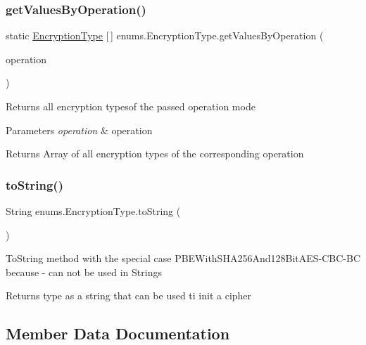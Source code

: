 \subsubsection{\texorpdfstring{get\+Values\+By\+Operation()}{getValuesByOperation()}}
{\footnotesize\ttfamily static \mbox{\hyperlink{enumenums_1_1_encryption_type}{Encryption\+Type}} \mbox{[}$\,$\mbox{]} enums.\+Encryption\+Type.\+get\+Values\+By\+Operation (\begin{DoxyParamCaption}\item[{\mbox{\hyperlink{enumenums_1_1_operation_mode}{Operation\+Mode}}}]{operation }\end{DoxyParamCaption})\hspace{0.3cm}{\ttfamily [static]}}

Returns all encryption typesof the passed operation mode 
\begin{DoxyParams}{Parameters}
{\em operation} & operation \\
\hline
\end{DoxyParams}
\begin{DoxyReturn}{Returns}
Array of all encryption types of the corresponding operation 
\end{DoxyReturn}
\mbox{\label{enumenums_1_1_encryption_type_a47a6aef4cb85c8608e6220ee8f4b4d33}} 
\subsubsection{\texorpdfstring{to\+String()}{toString()}}
{\footnotesize\ttfamily String enums.\+Encryption\+Type.\+to\+String (\begin{DoxyParamCaption}{ }\end{DoxyParamCaption})}

To\+String method with the special case P\+B\+E\+With\+S\+H\+A256\+And128\+Bit\+A\+E\+S-\/\+C\+B\+C-\/\+BC because \textquotesingle{}-\/\textquotesingle{} can not be used in Strings \begin{DoxyReturn}{Returns}
type as a string that can be used ti init a cipher 
\end{DoxyReturn}


\subsection{Member Data Documentation}
\mbox{\label{enumenums_1_1_encryption_type_a04b61e8116df22daab2d12f3e62b66cc}} 
